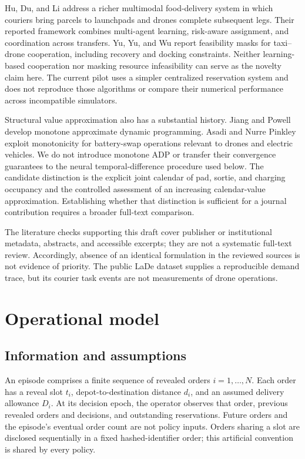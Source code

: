 \documentclass[11pt,a4paper]{article}
\begin{document}
Hu, Du, and Li \cite{hu} address a richer multimodal food-delivery system in which couriers bring parcels to launchpads and drones complete subsequent legs. Their reported framework combines multi-agent learning, risk-aware assignment, and coordination across transfers. Yu, Yu, and Wu \cite{yu} report feasibility masks for taxi--drone cooperation, including recovery and docking constraints. Neither learning-based cooperation nor masking resource infeasibility can serve as the novelty claim here. The current pilot uses a simpler centralized reservation system and does not reproduce those algorithms or compare their numerical performance across incompatible simulators.

Structural value approximation also has a substantial history. Jiang and Powell \cite{jiang} develop monotone approximate dynamic programming. Asadi and Nurre Pinkley \cite{asadi} exploit monotonicity for battery-swap operations relevant to drones and electric vehicles. We do not introduce monotone ADP or transfer their convergence guarantees to the neural temporal-difference procedure used below. The candidate distinction is the explicit joint calendar of pad, sortie, and charging occupancy and the controlled assessment of an increasing calendar-value approximation. Establishing whether that distinction is sufficient for a journal contribution requires a broader full-text comparison.

The literature checks supporting this draft cover publisher or institutional metadata, abstracts, and accessible excerpts; they are not a systematic full-text review. Accordingly, absence of an identical formulation in the reviewed sources is not evidence of priority. The public LaDe dataset \cite{lade} supplies a reproducible demand trace, but its courier task events are not measurements of drone operations.

\section{Operational model}
\subsection{Information and assumptions}
An episode comprises a finite sequence of revealed orders $i=1,\ldots,N$. Each order has a reveal slot $t_i$, depot-to-destination distance $d_i$, and an assumed delivery allowance $D_i$. At its decision epoch, the operator observes that order, previous revealed orders and decisions, and outstanding reservations. Future orders and the episode's eventual order count are not policy inputs. Orders sharing a slot are disclosed sequentially in a fixed hashed-identifier order; this artificial convention is shared by every policy.
\end{document}
